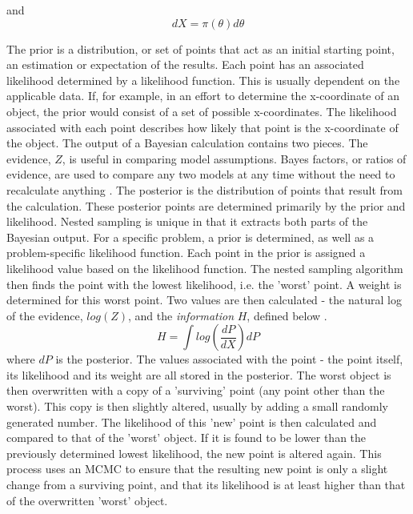 \documentclass[a4paper,12pt]{article}
\begin{document}
and
\begin{equation}
 dX = \pi(\theta)d\theta
\end{equation}

The prior is a distribution, or set of points that act as an initial starting point, an estimation or expectation of the results.  Each point has an associated likelihood determined by a likelihood function.  This is usually dependent on the applicable data.  If, for example, in an effort to determine the x-coordinate of an object, the prior would consist of a set of possible x-coordinates.  The likelihood associated with each point describes how likely that point is the x-coordinate of the object.
\newline
The output of a Bayesian calculation contains two pieces. The evidence, $Z$, is useful in comparing model assumptions.  Bayes factors, or ratios of evidence, are used to compare any two models at any time without the need to recalculate anything \cite{skilling}. The posterior is the distribution of points that result from the calculation.  These posterior points are determined primarily by the prior and likelihood.
\newline
Nested sampling is unique in that it extracts both parts of the Bayesian output.  For a specific problem, a prior is determined, as well as a problem-specific likelihood function.  Each point in the prior is assigned a likelihood value based on the likelihood function.  The nested sampling algorithm then finds the point with the lowest likelihood, i.e. the 'worst' point. A weight is determined for this worst point. Two values are then calculated - the natural log of the evidence, $log(Z)$, and the \textit{information} $H$, defined below \cite{sivia}.
\begin{equation}
 H = \int log(\frac{dP}{dX})dP
\end{equation}
where $dP$ is the posterior.  The values associated with the point - the point itself, its likelihood and its weight are all stored in the posterior.  The worst object is then overwritten with a copy of a 'surviving' point (any point other than the worst).  This copy is then slightly altered, usually by adding a small randomly generated number.  The likelihood of this 'new' point is then calculated and compared to that of the 'worst' object.  If it is found to be lower than the previously determined lowest likelihood, the new point is altered again.  This process uses an MCMC to ensure that the resulting new point is only a slight change from a surviving point, and that its likelihood is at least higher than that of the overwritten 'worst' object.
\end{document}
